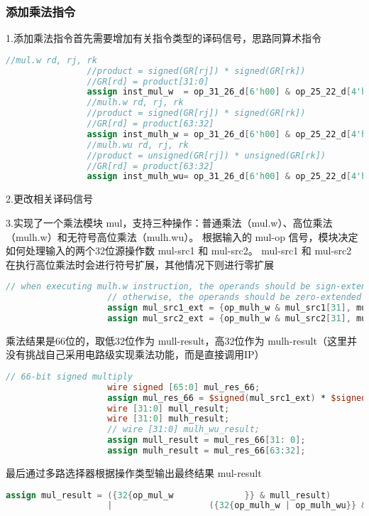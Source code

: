 \documentclass[12pt,a4paper]{article}
\begin{document}
        \subsubsection{添加乘法指令}
            1.添加乘法指令首先需要增加有关指令类型的译码信号，思路同算术指令
            \begin{lstlisting}[language=Verilog]
                //mul.w rd, rj, rk
                //product = signed(GR[rj]) * signed(GR[rk])
                //GR[rd] = product[31:0]
                assign inst_mul_w  = op_31_26_d[6'h00] & op_25_22_d[4'h0] & op_21_20_d[2'h1] & op_19_15_d[5'h18];
                //mulh.w rd, rj, rk
                //product = signed(GR[rj]) * signed(GR[rk])
                //GR[rd] = product[63:32]
                assign inst_mulh_w = op_31_26_d[6'h00] & op_25_22_d[4'h0] & op_21_20_d[2'h1] & op_19_15_d[5'h19];
                //mulh.wu rd, rj, rk
                //product = unsigned(GR[rj]) * unsigned(GR[rk])
                //GR[rd] = product[63:32]
                assign inst_mulh_wu= op_31_26_d[6'h00] & op_25_22_d[4'h0] & op_21_20_d[2'h1] & op_19_15_d[5'h1a];
            \end{lstlisting}
            \par
            2.更改相关译码信号
            \par
            3.实现了一个乘法模块 mul，支持三种操作：普通乘法（mul.w）、高位乘法（mulh.w）和无符号高位乘法（mulh.wu）。
            根据输入的 mul-op 信号，模块决定如何处理输入的两个32位源操作数 mul-src1 和 mul-src2。           
            mul-src1 和 mul-src2 在执行高位乘法时会进行符号扩展，其他情况下则进行零扩展
                \begin{lstlisting}[language=Verilog]
                    // when executing mulh.w instruction, the operands should be sign-extended;
                    // otherwise, the operands should be zero-extended
                    assign mul_src1_ext = {op_mulh_w & mul_src1[31], mul_src1};
                    assign mul_src2_ext = {op_mulh_w & mul_src2[31], mul_src2};
                \end{lstlisting}
            乘法结果是66位的，取低32位作为 mull-result，高32位作为 mulh-result（这里并没有挑战自己采用电路级实现乘法功能，而是直接调用IP）
                \begin{lstlisting}[language=Verilog]
                    // 66-bit signed multiply
                    wire signed [65:0] mul_res_66;
                    assign mul_res_66 = $signed(mul_src1_ext) * $signed(mul_src2_ext);
                    wire [31:0] mull_result;
                    wire [31:0] mulh_result;
                    // wire [31:0] mulh_wu_result;
                    assign mull_result = mul_res_66[31: 0];
                    assign mulh_result = mul_res_66[63:32];
                \end{lstlisting}
            最后通过多路选择器根据操作类型输出最终结果 mul-result
                \begin{lstlisting}[language=Verilog]
                    assign mul_result = ({32{op_mul_w              }} & mull_result)
                    |                   ({32{op_mulh_w | op_mulh_wu}} & mulh_result);
                \end{lstlisting}
                
\end{document}
